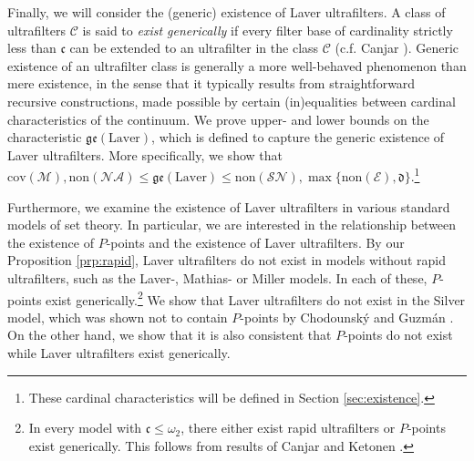 \documentclass[12pt]{article}
\theoremstyle{definition}
\begin{document}
Finally, we will consider the (generic) existence of Laver ultrafilters. A class of ultrafilters $\mathcal{C}$ is said to \emph{exist generically} if every filter base of cardinality strictly less than $\mathfrak{c}$ can be extended to an ultrafilter in the class $\mathcal{C}$ (c.f. Canjar \cite{Canjar-gen}). Generic existence of an ultrafilter class is generally a more well-behaved phenomenon than mere existence, in the sense that it typically results from straightforward recursive constructions, made possible by certain (in)equalities between cardinal characteristics of the continuum. We prove upper- and lower bounds on the characteristic $\mathfrak{ge}(\text{Laver})$, which is defined to capture the generic existence of Laver ultrafilters. More specifically, we show that $\text{cov}(\mathcal{M}), \text{non}(\mathcal{NA}) \leq \mathfrak{ge}(\text{Laver})\leq \text{non}(\mathcal{SN}), \max\{\text{non}(\mathcal{E}), \mathfrak{d}\}$.\footnote{These cardinal characteristics will be defined in Section \ref{sec:existence}.}

Furthermore, we examine the existence of Laver ultrafilters in various standard models of set theory. In particular, we are interested in the relationship between the existence of $P$-points and the existence of Laver ultrafilters. By our Proposition \ref{prp:rapid}, Laver ultrafilters do not exist in models without rapid ultrafilters, such as the Laver-, Mathias- or Miller models. In each of these, $P$-points exist generically.\footnote{In every model with $\mathfrak{c}\leq \omega_2$, there either exist rapid ultrafilters or $P$-points exist generically. This follows from results of Canjar \cite{Canjar-gen} and Ketonen \cite{ketonen1976existence}.} We show that Laver ultrafilters do not exist in the Silver model, which was shown not to contain $P$-points by Chodounsk\'y and Guzm\'an \cite{chodguz-ppoints}. On the other hand, we show that it is also consistent that $P$-points do not exist while Laver ultrafilters exist generically.
\end{document}
